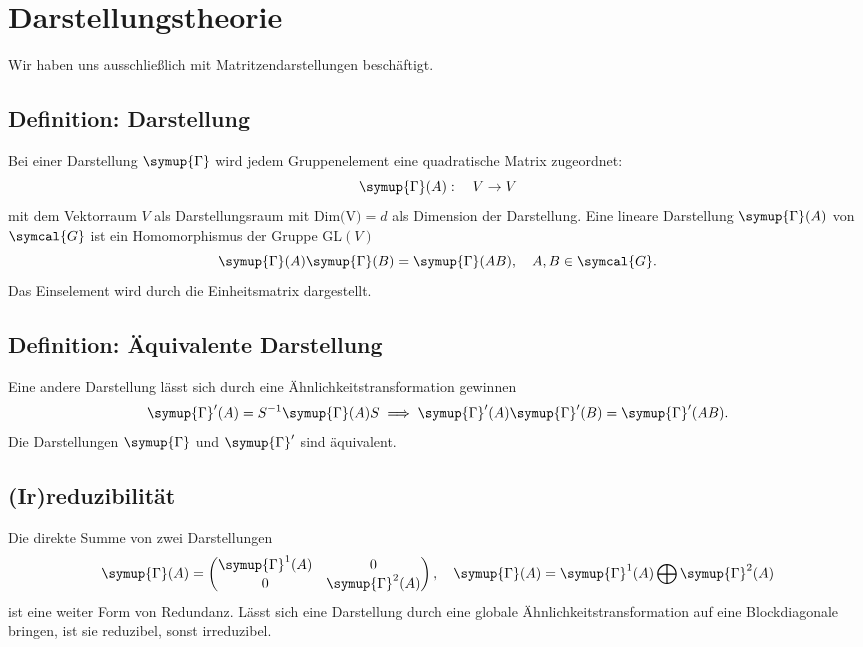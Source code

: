 \documentclass[
  captions=tableheading,  %
  titlepage=firstiscover, %
]{scrartcl}
\begin{document}
\section{Darstellungstheorie}
Wir haben uns ausschließlich mit Matritzendarstellungen beschäftigt.
\subsection{Definition: Darstellung}
Bei einer Darstellung $\symup{\Gamma}$ wird jedem Gruppenelement eine quadratische Matrix zugeordnet:
\begin{equation*}
  \symup{\Gamma}(A) : \quad V \to V
\end{equation*}
mit dem Vektorraum $V$ als Darstellungsraum mit $\text{Dim(V)} = d$ als 
Dimension der Darstellung.
Eine lineare Darstellung $\symup{\Gamma} (A)$ von $\symcal{G}$ ist ein Homomorphismus der Gruppe GL$(V)$
\begin{equation*}
  \symup{\Gamma}(A) \symup{\Gamma}(B) = \symup{\Gamma}(AB), \quad A,B \in \symcal{G}.
\end{equation*} 
Das Einselement wird durch die Einheitsmatrix dargestellt.
\subsection{Definition: Äquivalente Darstellung}
Eine andere Darstellung lässt sich durch eine Ähnlichkeitstransformation gewinnen
\begin{equation*}
  \symup{\Gamma}'(A) = S^{-1} \symup{\Gamma} (A) S \implies \symup{\Gamma}'(A) \symup{\Gamma}'(B) = \symup{\Gamma}'(AB).
\end{equation*}
Die Darstellungen $\symup{\Gamma}$ und $\symup{\Gamma}'$ sind äquivalent.
\subsection{(Ir)reduzibilität}
Die direkte Summe von zwei Darstellungen 
\begin{equation*}
  \symup{\Gamma} (A) = 
  \begin{pmatrix}
    \symup{\Gamma}^1 (A)  & 0           \\
    0             & \symup{\Gamma}^2(A)
  \end{pmatrix}
  , \quad \symup{\Gamma} (A) = \symup{\Gamma}^1 (A)\bigoplus \symup{\Gamma}^2(A)
\end{equation*}
ist eine weiter Form von Redundanz.
Lässt sich eine Darstellung durch eine globale Ähnlichkeitstransformation auf eine Blockdiagonale
bringen, ist sie reduzibel, sonst irreduzibel.
\end{document}
